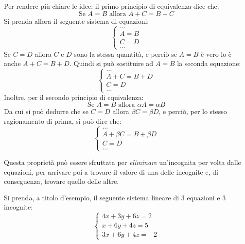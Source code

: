 Per rendere più chiare le idee: il primo principio di equivalenza dice che:
\[
    \text{Se } A = B \text{ allora } A + C = B + C
\]
Si prenda allora il seguente sistema di equazioni:
\[
    \begin{cases}
        \dots \\
        A = B \\
        C = D \\
        \dots
    \end{cases}
\]
Se $C = D$ allora $C$ e $D$ sono la stessa quantità, e perciò se $A = B$ è vero lo è anche $A + C = B + D$. Quindi si può sostituire ad $A = B$ la seconda equazione:
\[
    \begin{cases}
        \dots \\
        A + C = B + D \\
        C = D \\
        \dots
    \end{cases}
\]
Inoltre, per il secondo principio di equivalenza:
\[
    \text{Se } A = B \text{ allora } \alpha A = \alpha B
\]
Da cui si può dedurre che se $C = D$ allora $\beta C = \beta D$, e perciò, per lo stesso ragionamento di prima, si può dire che:
\[
    \begin{cases}
        \dots \\
        A + \beta C = B + \beta D \\
        C = D \\
        \dots
    \end{cases}
\]

Questa proprietà può essere sfruttata per \textit{eliminare} un'incognita per volta dalle equazioni, per arrivare poi a trovare il valore di una delle incognite e, di conseguenza, trovare quello delle altre.

Si prenda, a titolo d'esempio, il seguente sistema lineare di 3 equazioni e 3 incognite:
\[
    \begin{cases}
        4x + 3y + 6z = 2 \\
        x + 6y + 4z = 5 \\
        3x + 6y + 4z = -2
    \end{cases}
\]
